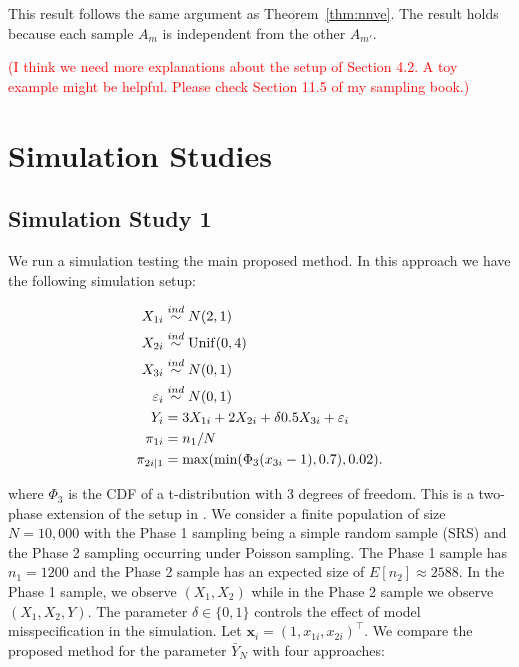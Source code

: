 \documentclass[12pt]{article}
\renewcommand{\bf}[1]{\mathbf{#1}}
\begin{document}
This result follows the same argument as Theorem~\eqref{thm:nnve}. The result
holds because each sample $A_m$ is independent from the other $A_{m'}$.

\textcolor{red}{(I think we need more explanations about the setup of Section 4.2. A toy example might be helpful. Please check Section 11.5 of my sampling book.) }


\section{Simulation Studies}

\subsection{Simulation Study 1}

We run a simulation testing the main proposed method. In this approach we have the
following simulation setup:

$$
\begin{aligned}
X_{1i} &\stackrel{ind}{\sim} N(2, 1) \\
X_{2i} &\stackrel{ind}{\sim} \rm{Unif}(0, 4) \\
X_{3i} &\stackrel{ind}{\sim} N(0, 1) \\
\varepsilon_i &\stackrel{ind}{\sim} N(0, 1) \\
Y_{i} &= 3 X_{1i} + 2 X_{2i} + \delta 0.5 X_{3i} + \varepsilon_i \\
\pi_{1i} &= n_1 / N \\
\pi_{2i|1} &= \max(\min(\Phi_3(x_{3i} - 1), 0.7), 0.02).
\end{aligned}
$$

where $\Phi_3$ is the CDF of a t-distribution with 3 degrees of freedom.
This is a two-phase extension of the setup in \cite{kwon2024debiased}. We
consider a finite population of size $N = 10,000$ with the Phase 1 sampling
being a simple random sample (SRS) and the 
Phase 2 sampling occurring under Poisson sampling. The Phase 1 sample has
$n_1 = 1200$ and the Phase 2 sample has an expected size of
$E[n_2] \approx 2588$. In the Phase 1 sample, we observe 
$(X_1, X_2)$ while in the Phase 2 sample we observe $(X_1, X_2, Y)$. 
The parameter $\delta \in \{0, 1\}$ controls the effect of model misspecification
in the simulation. Let $\bf x_i = (1, x_{1i}, x_{2i})^\top$. We compare the
proposed method for the parameter $\bar Y_N$ with four approaches:
\end{document}
